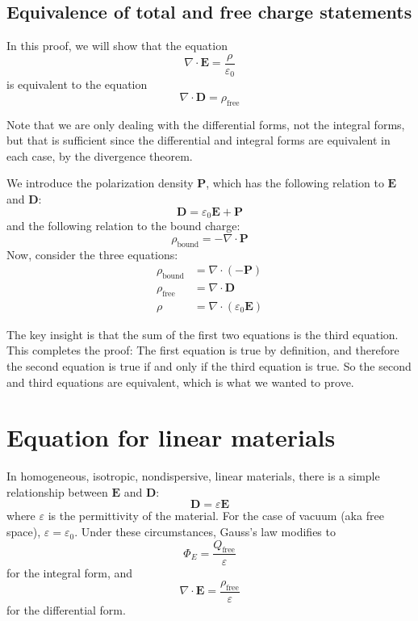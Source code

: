 \documentclass[a4paper, 12pt]{article}
\begin{document}
\subsection{Equivalence of total and free charge statements}
\begin{mdframed}[%
    style=mystyle,%
    frametitle={Proof that the formulations of Gauss's law in terms of free charge are equivalent to the formulations involving total charge.}]

In this proof, we will show that the equation 
\[
    \nabla \cdot \mathbf{E} = \frac{\rho}{\varepsilon_0}
\]
is equivalent to the equation 
\[
    \nabla \cdot \mathbf{D} = \rho_\text{free}
\]

Note that we are only dealing with the differential forms, not the integral forms, but that is sufficient since the differential and integral forms are equivalent in each case, by the divergence theorem. 

We introduce the polarization density \(\mathbf{P}\), which has the following relation to \(\mathbf{E}\) and \(\mathbf{D}\): 
\[
    \mathbf{D} = \varepsilon_0\mathbf{E} + \mathbf{P}
\]
and the following relation to the bound charge:
\[
    \rho_\text{bound} = -\nabla \cdot \mathbf{P}
\]
Now, consider the three equations: 
\begin{align*}
    \rho_\text{bound} &= \nabla \cdot ( - \mathbf{P})\\
    \rho_\text{free}  &= \nabla \cdot \mathbf{D} \\
    \rho              &= \nabla \cdot (\varepsilon_0\mathbf{E})
\end{align*}

The key insight is that the sum of the first two equations is the third equation. This completes the proof: The first equation is true by definition, and therefore the second equation is true if and only if the third equation is true. So the second and third equations are equivalent, which is what we wanted to prove. 
\end{mdframed}

\section{Equation for linear materials}
In homogeneous, isotropic, nondispersive, linear materials, there is a simple relationship between \(\mathbf{E}\) and \(\mathbf{D}\):
\[
    \mathbf{D} = \varepsilon\mathbf{E}
\]
where \(\varepsilon\) is the permittivity of the material. For the case of vacuum (aka free space), \(\varepsilon = \varepsilon_0\). Under these circumstances, Gauss's law modifies to 
\[
    \Phi_E = \frac{Q_\text{free}}{\varepsilon}
\]
for the integral form, and
\[
    \nabla \cdot \mathbf{E} = \frac{\rho_\text{free}}{\varepsilon}
\]
for the differential form.
\end{document}
